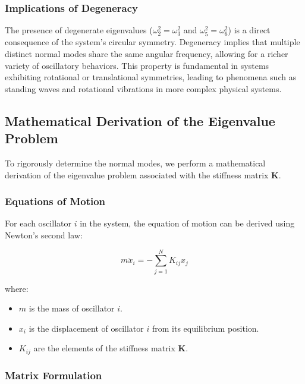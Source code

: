 \documentclass[12pt]{report} %
\begin{document}
\subsubsection{Implications of Degeneracy}
\label{subsubsec:part2_task2_degeneracy}

The presence of degenerate eigenvalues (\( \omega_2^2 = \omega_3^2 \) and \( \omega_5^2 = \omega_6^2 \)) is a direct consequence of the system's circular symmetry. Degeneracy implies that multiple distinct normal modes share the same angular frequency, allowing for a richer variety of oscillatory behaviors. This property is fundamental in systems exhibiting rotational or translational symmetries, leading to phenomena such as standing waves and rotational vibrations in more complex physical systems.

\subsection{Mathematical Derivation of the Eigenvalue Problem}
\label{subsec:part2_task2_derivation}

To rigorously determine the normal modes, we perform a mathematical derivation of the eigenvalue problem associated with the stiffness matrix \( \mathbf{K} \).

\subsubsection{Equations of Motion}
\label{subsubsec:part2_task2_eom}

For each oscillator \( i \) in the system, the equation of motion can be derived using Newton's second law:

\[
m \ddot{x}_i = -\sum_{j=1}^{N} K_{ij} x_j
\]

where:
\begin{itemize}
    \item \( m \) is the mass of oscillator \( i \).
    \item \( x_i \) is the displacement of oscillator \( i \) from its equilibrium position.
    \item \( K_{ij} \) are the elements of the stiffness matrix \( \mathbf{K} \).
\end{itemize}

\subsubsection{Matrix Formulation}
\label{subsubsec:part2_task2_matrix_formulation}
\end{document}

